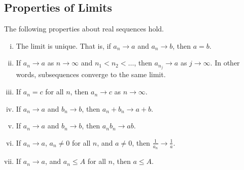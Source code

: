 \subsection{Properties of Limits}
\begin{lemma}
	The following properties about real sequences hold.
	\begin{enumerate}[(i)]
		\item The limit is unique.
		      That is, if \(a_n \to a\) and \(a_n \to b\), then \(a = b\).
		\item If \(a_n \to a\) as \(n \to \infty\) and \(n_1 < n_2 < \dots\), then \(a_{n_j} \to a\) as \(j \to \infty\).
		      In other words, subsequences converge to the same limit.
		\item If \(a_n = c\) for all \(n\), then \(a_n \to c\) as \(n \to \infty\).
		\item If \(a_n \to a\) and \(b_n \to b\), then \(a_n + b_n \to a + b\).
		\item If \(a_n \to a\) and \(b_n \to b\), then \(a_n b_n \to ab\).
		\item If \(a_n \to a\), \(a_n \neq 0\) for all \(n\), and \(a \neq 0\), then \(\frac{1}{a_n} \to \frac{1}{a}\).
		\item If \(a_n \to a\), and \(a_n \leq A\) for all \(n\), then \(a \leq A\).
	\end{enumerate}
\end{lemma}
